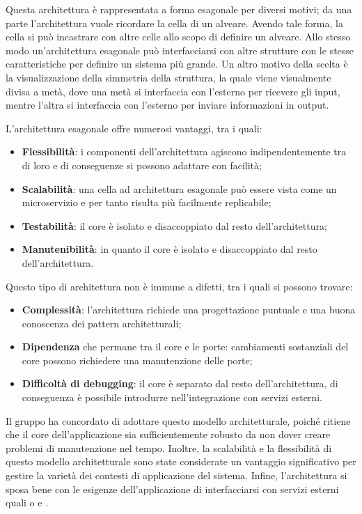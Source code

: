 \vspace{0.5\baselineskip}
\par Questa architettura è rappresentata a forma esagonale per diversi motivi; da una parte l'architettura vuole ricordare la cella di un alveare. Avendo tale forma, la cella si può incastrare con altre celle allo scopo di definire un alveare. Allo stesso modo un'architettura esagonale può interfacciarsi con altre strutture con le stesse caratteristiche per definire un sistema più grande. Un altro motivo della scelta è la visualizzazione della simmetria della struttura, la quale viene visualmente divisa a metà, dove una metà si interfaccia con l'esterno per ricevere gli input, mentre l'altra si interfaccia con l'esterno per inviare informazioni in output.
\par L'architettura esagonale offre numerosi vantaggi, tra i quali:
\begin{itemize}
    \item \textbf{Flessibilità}: i componenti dell'architettura agiscono indipendentemente tra di loro e di conseguenze si possono adattare con facilità;
    \item \textbf{Scalabilità}: una cella ad architettura esagonale può essere vista come un microservizio e per tanto risulta più facilmente replicabile;
    \item \textbf{Testabilità}: il core è isolato e disaccoppiato dal resto dell'architettura;
    \item \textbf{Manutenibilità}: in quanto il core è isolato e disaccoppiato dal resto dell'architettura.
\end{itemize}

\vspace{0.5\baselineskip}
\par Questo tipo di architettura non è immune a difetti, tra i quali si possono trovare:
\begin{itemize}
    \item \textbf{Complessità}: l'architettura richiede una progettazione puntuale e una buona conoscenza dei pattern architetturali;
    \item \textbf{Dipendenza} che permane tra il core e le porte: cambiamenti sostanziali del core possono richiedere una manutenzione delle porte;
    \item \textbf{Difficoltà di debugging}: il core è separato dal resto dell'architettura, di conseguenza è possibile introdurre  nell'integrazione con servizi esterni.
\end{itemize}

\vspace{0.5\baselineskip}
\par Il gruppo ha concordato di adottare questo modello architetturale, poiché ritiene che il core dell'applicazione sia sufficientemente robusto da non dover creare problemi di manutenzione nel tempo. Inoltre, la scalabilità e la flessibilità di questo modello architetturale sono state considerate un vantaggio significativo per gestire la varietà dei contesti di applicazione del sistema. Infine, l'architettura si sposa bene con le esigenze dell'applicazione di interfacciarsi con servizi esterni quali  o  e .